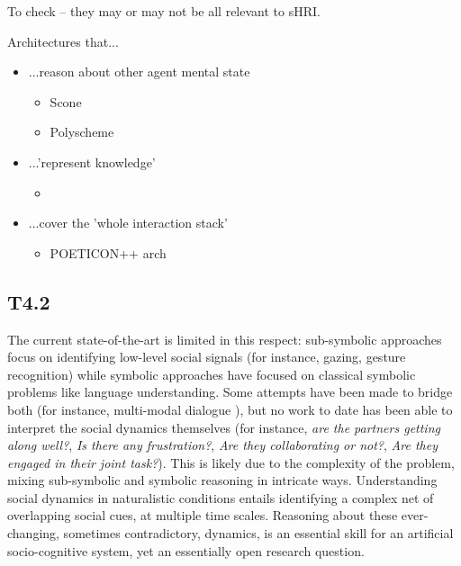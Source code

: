 \documentclass[11pt,a4paper]{report}
\begin{document}
To check -- they may or may not be all relevant to sHRI.

Architectures that...

\begin{itemize}
    \item ...reason about other agent mental state
    \begin{itemize}
        \item Scone~\cite{fahlman2011using}
        \item Polyscheme~\cite{bello2011shared}
    \end{itemize}
    \item ...'represent knowledge'
        \begin{itemize}
            \item \cite{zhang2014towards}
        \end{itemize}
    \item ...cover the 'whole interaction stack'
        \begin{itemize}
            \item POETICON++ arch~\cite{antunes2016from} 
        \end{itemize}
\end{itemize}

\subsection{T4.2}

The current state-of-the-art is limited in this respect: sub-symbolic
approaches focus on identifying low-level social signals (for instance,
gazing, gesture recognition) while symbolic approaches have focused on
classical symbolic problems like language understanding. Some attempts
have been made to bridge both (for instance, multi-modal dialogue
\cite{lemaignan2011grounding, lemaignan2017artificial}), but no work to
date has been able to interpret the social dynamics themselves (for
instance, \emph{are the partners getting along well?}, \emph{Is there
any frustration?}, \emph{Are they collaborating or not?}, \emph{Are they
engaged in their joint task?}). This is likely due to the complexity of
the problem, mixing sub-symbolic and symbolic reasoning in intricate
ways. Understanding social dynamics in naturalistic conditions entails
identifying a complex net of overlapping social cues, at multiple time
scales. Reasoning about these ever-changing, sometimes contradictory,
dynamics, is an essential skill for an artificial socio-cognitive
system, yet an essentially open research question.
\end{document}
